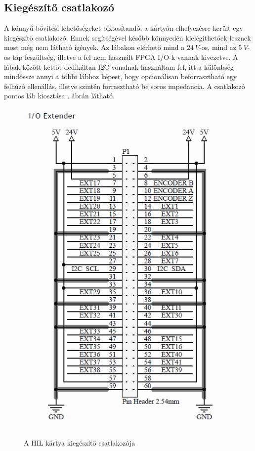 \subsection{Kiegészítő csatlakozó}

A könnyű bővítési lehetőségeket biztosítandó, a kártyán elhelyezésre került egy kiegészítő csatlakozó. Ennek segítségével később könnyedén kielégíthetőek lesznek most még nem látható igények. Az lábakon elérhető mind a $24\ V$-os, mind az $5\ V$-os táp feszültség, illetve a fel nem használt FPGA I/O-k vannak kivezetve. A lábak között kettőt dedikáltan I2C vonalnak használtam fel, itt a különbség mindössze annyi a többi lábhoz képest, hogy opcionálisan beforrasztható egy felhúzó ellenállás, illetve szintén forrasztható be soros impedancia. A csatlakozó pontos láb kiosztása . ábrán látható.

\begin{figure}[!h]
	\centering
	\includegraphics[width = \textwidth]{figures/hil_extender.png}
	\caption{A HIL kártya kiegészítő csatlakozója} 
	\label{fig:hil_extender}
\end{figure}

